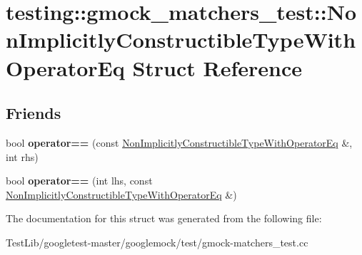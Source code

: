\hypertarget{structtesting_1_1gmock__matchers__test_1_1NonImplicitlyConstructibleTypeWithOperatorEq}{}\section{testing\+:\+:gmock\+\_\+matchers\+\_\+test\+:\+:Non\+Implicitly\+Constructible\+Type\+With\+Operator\+Eq Struct Reference}
\label{structtesting_1_1gmock__matchers__test_1_1NonImplicitlyConstructibleTypeWithOperatorEq}
\subsection*{Friends}
\begin{DoxyCompactItemize}
\item 
\mbox{\label{structtesting_1_1gmock__matchers__test_1_1NonImplicitlyConstructibleTypeWithOperatorEq_a20e9067f1f4becd397742e0db7351d6a}} 
bool {\bfseries operator==} (const \hyperlink{structtesting_1_1gmock__matchers__test_1_1NonImplicitlyConstructibleTypeWithOperatorEq}{Non\+Implicitly\+Constructible\+Type\+With\+Operator\+Eq} \&, int rhs)
\item 
\mbox{\label{structtesting_1_1gmock__matchers__test_1_1NonImplicitlyConstructibleTypeWithOperatorEq_a801c8151d7f7ff24243019980934d143}} 
bool {\bfseries operator==} (int lhs, const \hyperlink{structtesting_1_1gmock__matchers__test_1_1NonImplicitlyConstructibleTypeWithOperatorEq}{Non\+Implicitly\+Constructible\+Type\+With\+Operator\+Eq} \&)
\end{DoxyCompactItemize}


The documentation for this struct was generated from the following file\+:\begin{DoxyCompactItemize}
\item 
Test\+Lib/googletest-\/master/googlemock/test/gmock-\/matchers\+\_\+test.\+cc\end{DoxyCompactItemize}
